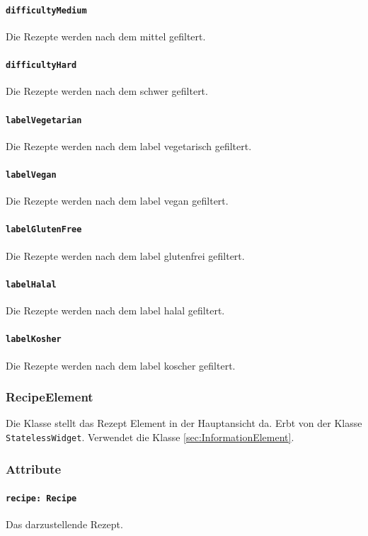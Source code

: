 \documentclass[parskip=full]{scrartcl}
\begin{document}
            \paragraph*{\texttt{difficultyMedium}} Die Rezepte werden nach dem  mittel gefiltert.
            \paragraph*{\texttt{difficultyHard}} Die Rezepte werden nach dem  schwer gefiltert.
            \paragraph*{\texttt{labelVegetarian}} Die Rezepte werden nach dem \gls{label} vegetarisch gefiltert.
            \paragraph*{\texttt{labelVegan}} Die Rezepte werden nach dem \gls{label} vegan gefiltert.
            \paragraph*{\texttt{labelGlutenFree}} Die Rezepte werden nach dem \gls{label} glutenfrei gefiltert.
            \paragraph*{\texttt{labelHalal}} Die Rezepte werden nach dem \gls{label} halal gefiltert.
            \paragraph*{\texttt{labelKosher}} Die Rezepte werden nach dem \gls{label} koscher gefiltert.

    \subsubsection*{RecipeElement}
        Die Klasse stellt das Rezept Element in der Hauptansicht da. Erbt von der Klasse \texttt{StatelessWidget}. Verwendet die Klasse \ref{sec:InformationElement}.
        \subsubsection*{Attribute}
            \paragraph*{\texttt{recipe: Recipe}} Das darzustellende Rezept.
\end{document}

